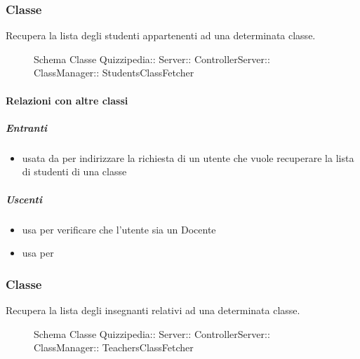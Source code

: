 \subsubsection{Classe }
Recupera la lista degli studenti appartenenti ad una determinata classe.
\begin{figure}[H]
\centering
\noindent{}
\caption[Schema Classe StudentsClassFetcher]{Schema Classe Quizzipedia:: Server:: ControllerServer:: ClassManager:: StudentsClassFetcher}
\end{figure}
\paragraph{Relazioni con altre classi}
\subparagraph{Entranti}
\begin{itemize}
\item usata da  per indirizzare la richiesta di un utente che vuole recuperare la lista di studenti di una classe
\end{itemize}
\subparagraph{Uscenti}
\begin{itemize}
\item usa  per verificare che l'utente sia un Docente
\item usa  per 
\end{itemize}
\subsubsection{Classe }
Recupera la lista degli insegnanti relativi ad una determinata classe.
\begin{figure}[H]
\centering
\noindent{}
\caption[Schema Classe TeachersClassFetcher]{Schema Classe Quizzipedia:: Server:: ControllerServer:: ClassManager:: TeachersClassFetcher}
\end{figure}
